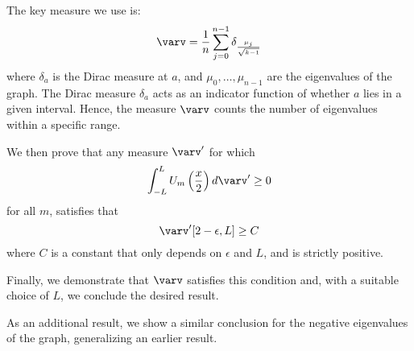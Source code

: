 \documentclass[11pt]{article}
\theoremstyle{definition}
\begin{document}
    The key measure we use is:
    $$\varv = \frac{1}{n} \sum^{n-1}_{j=0} \delta_{\frac{\mu_j}{\sqrt{k-1}}}$$
    where $\delta_a$ is the Dirac measure at $a$, and $\mu_0, \dots, \mu_{n-1}$ are the eigenvalues of the graph.
    The Dirac measure $\delta_a$ acts as an indicator function of whether $a$ lies in a given interval.
    Hence, the measure $\varv$ counts the number of eigenvalues within a specific range.
    \newline

    We then prove that any measure $\varv'$ for which
    $$\int_{-L}^L U_m\left(\frac{x}{2}\right) d\varv' \geq 0$$
    for all $m$, satisfies that
    $$\varv'[2-\epsilon, L] \geq C$$
    where $C$ is a constant that only depends on $\epsilon$ and $L$, and is strictly positive.
    \newline

    Finally, we demonstrate that $\varv$ satisfies this condition and, with a suitable choice of $L$, we conclude the desired result.
    \newline

    As an additional result, we show a similar conclusion for the negative eigenvalues of the graph, generalizing an earlier result.
\end{document}
